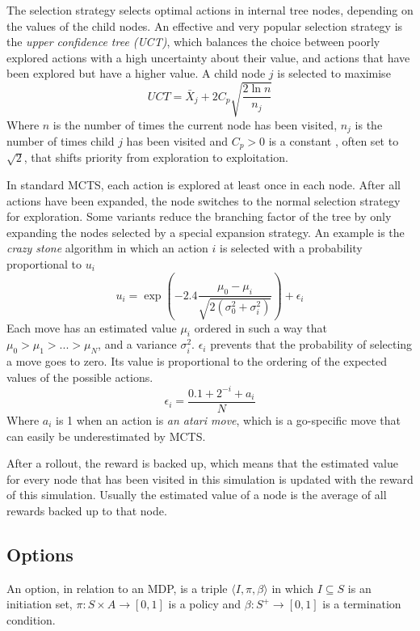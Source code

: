 The selection strategy selects optimal actions in internal tree nodes, depending
on the values of the child nodes. An effective and very popular selection
strategy is the \emph{upper confidence tree (UCT)}\cite{kocsis2006bandit}, which balances the choice 
between poorly explored actions with a high uncertainty about their value, and
actions that have been explored but have a higher value. A child node $j$ is
selected to maximise
$$UCT = \bar{X}_j + 2C_p \sqrt{\frac{2 \ln n}{n_j}}$$
Where $n$ is the number of times the current node has been visited, $n_j$ is the
number of times child $j$ has been visited and $C_p > 0$ is a constant , often
set to $\sqrt{2}$, that shifts priority from exploration to exploitation.
	
In standard MCTS, each action is explored at least once in each node. After all
actions have been expanded, the node switches to the normal selection strategy
for exploration. Some variants reduce the branching factor of the tree by only
expanding the nodes selected by a special expansion strategy. An example is the
\emph{crazy stone} algorithm\cite{coulom2007efficient} in which an action $i$ is selected with a
probability proportional to $u_i$
$$u_i = \exp\left(-2.4\frac{\mu_0 - \mu_i}{\sqrt{2\left(\sigma_0^2 +
\sigma_i^2\right)}}\right) + \epsilon_i$$
Each move has an estimated value $\mu_i$ ordered in such a way that $\mu_0 >
\mu_1 > ... > \mu_N$, and a variance $\sigma_i^2$. $\epsilon_i$ prevents that
the probability of selecting a move goes to zero. Its value is proportional to
the ordering of the expected values of the possible actions.
$$\epsilon_i = \frac{0.1 + 2^{-i} + a_i}{N}$$
Where $a_i$ is 1 when an action is \emph{an atari move}, which is a go-specific
move that can easily be underestimated by MCTS.

After a rollout, the reward is backed up, which means that the estimated value
for every node that has been visited in this simulation is updated with the
reward of this simulation. Usually the estimated value of a node is the average
of all rewards backed up to that node.

\subsection{Options}
An option, in relation to an MDP, is a triple $\langle I, \pi, \beta\rangle$ in
which $I \subseteq S$ is an initiation set, $\pi: S \times A \rightarrow [0, 1]$
is a policy and $\beta: S^+ \rightarrow[0,1]$ is a termination
condition.\cite{sutton1999between}

